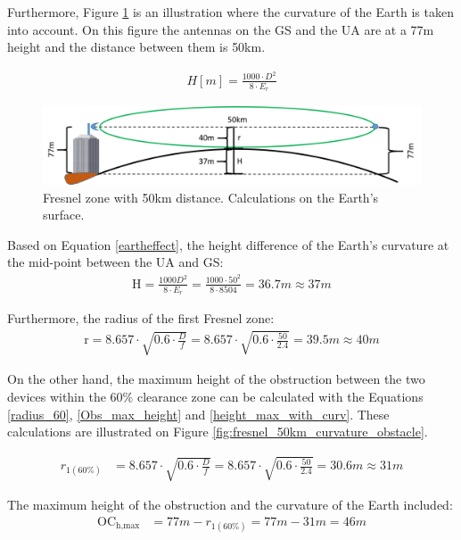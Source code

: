 Furthermore, Figure \ref{fig:fresnel_50km_curvature} is an illustration where the curvature of the Earth is taken into account. On this figure the antennas on the GS and the UA are at a 77m height and the distance between them is 50km. 

\begin{align}
H [m] = \frac{1000\cdot D^2}{8\cdot E_r}\label{eartheffect}
\end{align}

\begin{figure}[H]
	\centering
	\includegraphics[scale=0.50]{figures/fresnel_50km_curvature.png}
	\caption{Fresnel zone with 50km distance. Calculations on the Earth's surface.}
	\label{fig:fresnel_50km_curvature}
\end{figure}

Based on Equation \ref{eartheffect}, the height difference of the Earth's curvature at the mid-point between the UA and GS:
\begin{align}
\text{H} = \frac{1000 D^2}{8 \cdot E_r} = \frac{1000 \cdot 50^2}{8\cdot 8504} = 36.7m \approx 37m 
\end{align}

Furthermore, the radius of the first Fresnel zone:
\begin{align*}
\text{r} = 8.657\cdot \sqrt{0.6\cdot\frac{D}{f}} = 8.657\cdot \sqrt{0.6\cdot\frac{50}{2.4}} = 39.5m \approx 40m 
\end{align*}

On the other hand, the maximum height of the obstruction between the two devices within the 60$\%$ clearance zone can be calculated with the Equations \ref{radius_60}, \ref{Obs_max_height} and \ref{height_max_with_curv}. These calculations are illustrated on Figure \ref{fig:fresnel_50km_curvature_obstacle}.

\begin{align}
r_{1(60\%)} &= 8.657\cdot \sqrt{0.6\cdot\frac{D}{f}} = 8.657\cdot \sqrt{0.6\cdot\frac{50}{2.4}} = 30.6m \approx 31m \label{radius_60}
\end{align}

The maximum height of the obstruction and the curvature of the Earth included:
\begin{align}
\text{OC}_{\text{h,max}} &= 77m - r_{1(60\%)} = 77m - 31m = 46m \label{Obs_max_height}
\end{align}

